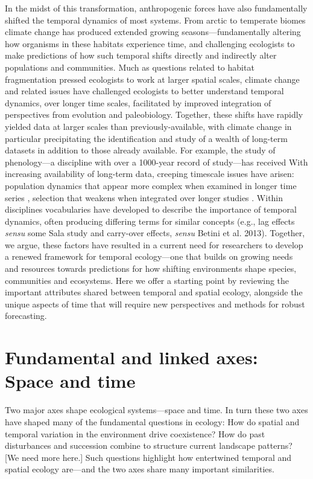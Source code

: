 \documentclass[11pt,a4paper,oneside]{article}
\begin{document}
In the midst of this transformation, anthropogenic forces have also fundamentally shifted the temporal dynamics of most systems. From arctic to temperate biomes climate change has produced extended growing seasons---fundamentally altering how organisms in these habitats experience time, and challenging ecologists to make predictions of how such temporal shifts directly and indirectly alter populations and communities. Much as questions related to habitat fragmentation pressed ecologists to work at larger spatial scales, climate change and related issues have challenged ecologists to better understand temporal dynamics, over longer time scales, facilitated by improved integration of perspectives from evolution and paleobiology. Together, these shifts have rapidly yielded data at larger scales than previously-available, with climate change in particular precipitating the identification and study of a wealth of long-term datasets in addition to those already available. For example, the study of phenology---a discipline with over a 1000-year record of study---has received With increasing availability of long-term data, creeping timescale issues have arisen: population dynamics that appear more complex when examined in longer time series \citep{Ziebarth2010}, selection that weakens when integrated over longer studies \citep{Hendry1999,schoener2011}. Within disciplines vocabularies have developed to describe the importance of temporal dynamics, often producing differing terms for similar concepts (e.g., lag effects \emph{sensu} some Sala study and carry-over effects, \emph{sensu} Betini et al. 2013). Together, we argue, these factors have resulted in a current need for researchers to develop a renewed framework for temporal ecology---one that builds on growing needs and resources towards predictions for how shifting environments shape species, communities and ecosystems. Here we offer a starting point by reviewing the important attributes shared between temporal and spatial ecology, alongside the unique aspects of time that will require new perspectives and methods for robust forecasting. \\

\section{Fundamental and linked axes: Space and time}
Two major axes shape ecological systems---space and time. In turn these two axes have shaped many of the fundamental questions in ecology: How do spatial and temporal variation in the environment drive coexistence? How do past disturbances and succession combine to structure current landscape patterns? [We need more here.] Such questions highlight how entertwined temporal and spatial ecology are---and the two axes share many important similarities.\\
\end{document}

